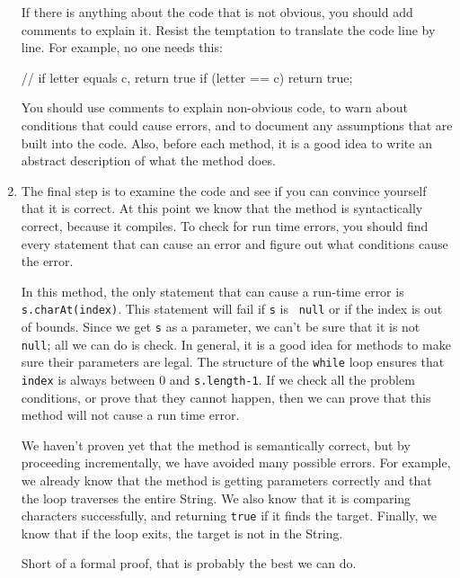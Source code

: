 \documentclass{book}
\begin{document}
\begin{enumerate}
If there is anything about the code that is not obvious, you
should add comments to explain it.  Resist the temptation to
translate the code line by line.  For example, no one needs this:

\begin{verbatimtab}
        // if letter equals c, return true
        if (letter == c) {
            return true;
        }
\end{verbatimtab}

You should use comments to explain non-obvious code, to warn
about conditions that could cause errors, and to document any
assumptions that are built into the code.  Also, before each
method, it is a good idea to write an abstract description of
what the method does.


\item The final step is to examine the code and see if you
can convince yourself that it is correct.  
At this point we know that the method is syntactically correct,
because it compiles.
To check for run time errors, you should find every statement
that can cause an error and figure out what conditions cause
the error.

In this method, the only statement that can cause a run-time error is
{\tt s.charAt(index)}.  This statement will fail if {\tt s} is {\tt
null} or if the index is out of bounds.  Since we get {\tt s} as a
parameter, we can't be sure that it is not {\tt null}; all we can do
is check.  In general, it is a good idea for methods to make sure
their parameters are legal.  The structure of the {\tt while} loop
ensures that {\tt index} is always between 0 and {\tt s.length-1}.  If
we check all the problem conditions, or prove that they cannot happen,
then we can prove that this method will not cause a run time error.

We haven't proven yet that the method is semantically correct, but by
proceeding incrementally, we have avoided many possible errors.  For
example, we already know that the method is getting parameters
correctly and that the loop traverses the entire String.  We also know
that it is comparing characters successfully, and returning {\tt true} if
it finds the target.  Finally, we know that if the loop exits,
the target is not in the String.

Short of a formal proof, that is probably the best we can do.

\end{enumerate}
\end{document}
